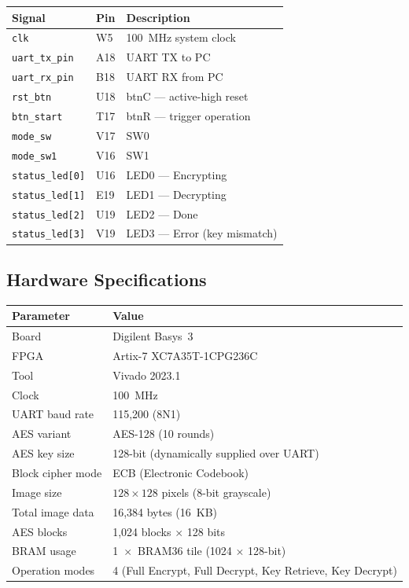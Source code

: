 \documentclass[12pt,a4paper]{article}
\begin{document}
\begin{center}\small
\begin{tabular}{lll}\toprule
\textbf{Signal} & \textbf{Pin} & \textbf{Description} \\ \midrule
\texttt{clk}            & W5  & 100~MHz system clock \\
\texttt{uart\_tx\_pin}  & A18 & UART TX to PC \\
\texttt{uart\_rx\_pin}  & B18 & UART RX from PC \\
\texttt{rst\_btn}       & U18 & btnC — active-high reset \\
\texttt{btn\_start}     & T17 & btnR — trigger operation \\
\texttt{mode\_sw}       & V17 & SW0 \\
\texttt{mode\_sw1}      & V16 & SW1 \\
\texttt{status\_led[0]} & U16 & LED0 — Encrypting \\
\texttt{status\_led[1]} & E19 & LED1 — Decrypting \\
\texttt{status\_led[2]} & U19 & LED2 — Done \\
\texttt{status\_led[3]} & V19 & LED3 — Error (key mismatch) \\
\bottomrule
\end{tabular}
\end{center}

\subsection{Hardware Specifications}

\begin{center}\small
\begin{tabular}{ll}\toprule
\textbf{Parameter} & \textbf{Value} \\ \midrule
Board             & Digilent Basys~3 \\
FPGA              & Artix-7 XC7A35T-1CPG236C \\
Tool              & Vivado 2023.1 \\
Clock             & 100~MHz \\
UART baud rate    & 115,200 (8N1) \\
AES variant       & AES-128 (10 rounds) \\
AES key size      & 128-bit (dynamically supplied over UART) \\
Block cipher mode & ECB (Electronic Codebook) \\
Image size        & $128 \times 128$ pixels (8-bit grayscale) \\
Total image data  & 16,384 bytes (16~KB) \\
AES blocks        & 1,024 blocks $\times$ 128 bits \\
BRAM usage        & 1~$\times$~BRAM36 tile (1024 $\times$ 128-bit) \\
Operation modes   & 4 (Full Encrypt, Full Decrypt, Key Retrieve, Key Decrypt) \\
\bottomrule
\end{tabular}
\end{center}
\end{document}
